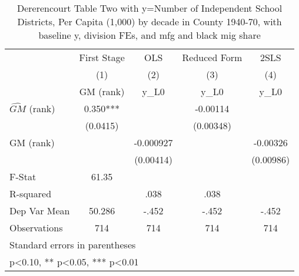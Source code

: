\begin{table}[htbp]\centering
\def\sym#1{\ifmmode^{#1}\else\(^{#1}\)\fi}
\caption{Dererencourt Table Two with y=Number of Independent School Districts, Per Capita (1,000) by decade in County 1940-70, with baseline y, division FEs, and mfg and black mig share}
\begin{tabular}{l*{4}{c}}
\toprule
                    & First Stage   &         OLS   &Reduced Form   &        2SLS   \\
                    &\multicolumn{1}{c}{(1)}&\multicolumn{1}{c}{(2)}&\multicolumn{1}{c}{(3)}&\multicolumn{1}{c}{(4)}\\
                    &\multicolumn{1}{c}{GM  (rank)}&\multicolumn{1}{c}{y\_L0}&\multicolumn{1}{c}{y\_L0}&\multicolumn{1}{c}{y\_L0}\\
\midrule
$\hat{GM}$ (rank)   &       0.350***&               &    -0.00114   &               \\
                    &    (0.0415)   &               &   (0.00348)   &               \\
\addlinespace
GM  (rank)          &               &   -0.000927   &               &    -0.00326   \\
                    &               &   (0.00414)   &               &   (0.00986)   \\
\midrule
F-Stat              &       61.35   &               &               &               \\
R-squared           &               &        .038   &        .038   &               \\
Dep Var Mean        &      50.286   &       -.452   &       -.452   &       -.452   \\
Observations        &         714   &         714   &         714   &         714   \\
\bottomrule
\multicolumn{5}{l}{\footnotesize Standard errors in parentheses}\\
\multicolumn{5}{l}{\footnotesize * p<0.10, ** p<0.05, *** p<0.01}\\
\end{tabular}
\end{table}
